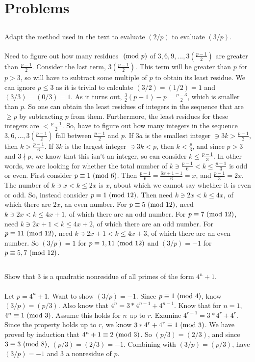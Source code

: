 \documentclass{article} \usepackage{amsmath}
\begin{document}
\section{Problems}

\subsection{}
Adapt the method used in the text to evaluate $(2/p)$ to evaluate $(3/p)$.\\~\\
Need to figure out how many residues $\ (\mathrm{mod}\ p)$ of
$3, 6, 9, ..., 3(\frac{p-1}{2})$ are greater than $\frac{p-1}{2}$.
Consider the last term, $3(\frac{p-1}{2})$.
This term will be greater than $p$ for $p > 3$, so will have to subtract some
multiple of $p$ to obtain its least residue.
We can ignore $p \leq 3$ as it is trivial to calculate $(3/2) = (1/2) = 1$ and
$(3/3) = (0/3) = 1$.
As it turns out, $\frac{3}{2}(p - 1) - p = \frac{p - 3}{2}$, which is smaller
than $p$.
So one can obtain the least residues of integers in the sequence that are
$\geq p$ by subtracting $p$ from them.
Furthermore, the least residues for these integers are $< \frac{p-1}{2}$.
So, have to figure out how many integers in the sequence
$3, 6, ..., 3(\frac{p-1}{2})$ fall between $\frac{p-1}{2}$ and $p$.
If $3a$ is the smallest integer $\ni 3k > \frac{p-1}{2}$, then $k > \frac{p-1}{6}$.
If $3k$ is the largest integer $\ni 3k < p$, then $k < \frac{p}{3}$,
and since $p > 3$ and $3 \nmid p$, we know that this isn't an integer, so can
consider $k \leq \frac{p-1}{3}$.
In other words, we are looking for whether the total number of
$k \ni \frac{p-1}{6} < k \leq \frac{p-1}{3}$ is odd or even.
First consider $p \equiv 1 \ (\mathrm{mod}\ 6)$.
Then $\frac{p-1}{6} = \frac{6x + 1 - 1}{6} = x$, and
$\frac{p-1}{3} = 2x$.
The number of $k \ni x < k \leq 2x$ is $x$, about which we cannot say whether it
is even or odd.
So, instead consider $p \equiv 1 \ (\mathrm{mod}\ 12)$.
Then need $k \ni 2x < k \leq 4x$, of which there are $2x$, an even number.
For $p \equiv 5 \ (\mathrm{mod}\ 12)$, need $k \ni 2x < k \leq 4x + 1$, of which there are an odd number.
For $p \equiv 7 \ (\mathrm{mod}\ 12)$, need $k \ni 2x + 1 < k \leq 4x + 2$,
of which there are an odd number.
For $p \equiv 11 \ (\mathrm{mod}\ 12)$, need $k \ni 2x + 1 < k \leq 4x + 3$,
of which there are an even number.
So $(3/p) = 1$ for $p \equiv 1, 11 \ (\mathrm{mod}\ 12)$ and $(3/p) = -1$ for $p \equiv 5, 7 \ (\mathrm{mod}\ 12)$.

\subsection{}
Show that 3 is a quadratic nonresidue of all primes of the form $4^n + 1$.\\~\\
Let $p = 4^n + 1$. Want to show $(3/p) = -1$.
Since $p \equiv 1 \ (\mathrm{mod}\ 4)$, know $(3/p) = (p/3)$.
Also know that $4^n = 3*4^{n-1} + 4^{n-1}$.
Know that for $n = 1$, $4^n \equiv 1 \ (\mathrm{mod}\ 3)$.
Assume this holds for $n$ up to $r$.
Examine $4^{r + 1} = 3 * 4^r + 4^r$.
Since the property holds up to $r$, we know $3*4^r + 4^r \equiv 1 \ (\mathrm{mod}\ 3)$.
We have proved by induction that $4^n + 1 \equiv 2 \ (\mathrm{mod}\ 3)$.
So $(p/3) = (2/3)$, and since $3 \equiv 3 \ (\mathrm{mod}\ 8)$, $(p/3) = (2/3) = -1$.
Combining with $(3/p) = (p/3)$, have $(3/p) = -1$ and 3 a nonresidue of $p$.
\end{document}

